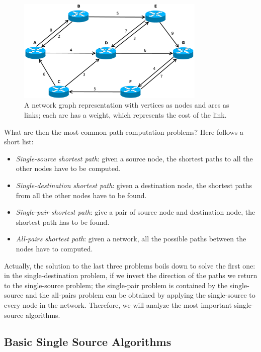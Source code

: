 \documentclass[10pt,a4paper]{report}
\begin{document}
\begin{figure}[!hbp]
  \begin{center}
    \includegraphics[width=0.8\textwidth]{img/graph_example}
    \caption[Network graph example]{A network graph representation with vertices
      as nodes and arcs as links; each arc has a weight, which
      represents the cost of the link.}
    \label{fig:graph_example}
  \end{center}
\end{figure}

What are then the most common path computation problems? Here follows
a short list:
\begin{itemize}
\item \textit{Single-source shortest path}: given a source node, the
  shortest paths to all the other nodes have to be computed.
\item \textit{Single-destination shortest path}: given a destination
  node, the shortest paths from all the other nodes have to be found.
\item \textit{Single-pair shortest path}: give a pair of source node
  and destination node, the shortest path has to be found.
\item \textit{All-pairs shortest path}: given a network, all the
  possible paths between the nodes have to computed.
\end{itemize}

Actually, the solution to the last three problems boils down to solve
the first one: in the single-destination problem, if we invert the
direction of the paths we return to the single-source problem; the
single-pair problem is contained by the single-source and the
all-pairs problem can be obtained by applying the single-source to
every node in the network. Therefore, we will analyze the most
important single-source algorithms.

\subsection{Basic Single Source Algorithms}
\end{document}
